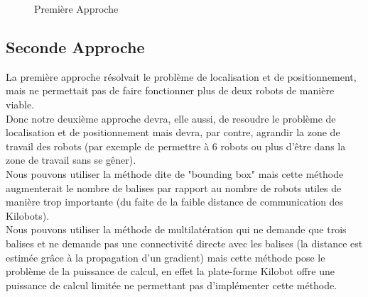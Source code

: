 \documentclass[a4paper,8pt]{report}
\begin{document}
\begin{figure}
  \caption{Premi\`ere Approche}
  \label{figureI}
\end{figure}

\subsection*{Seconde Approche}\label{sec:name}

La premi\`ere approche r\'esolvait le probl\`eme de localisation et de positionnement, mais ne permettait pas de faire fonctionner plus de deux robots de mani\`ere viable.\\
Donc notre deuxi\`eme approche devra, elle aussi, de resoudre le probl\`eme de localisation et de positionnement mais devra, par contre, agrandir la zone de travail des robots (par exemple de permettre \`a 6 robots ou plus d'\^etre dans la zone de travail sans se g\^ener).\\

\medskip
Nous pouvons utiliser la m\'ethode dite de "bounding box" mais cette m\'ethode augmenterait le nombre de balises par rapport au nombre de robots utiles de mani\`ere trop importante (du faite de la faible distance de communication des Kilobots).\\
Nous pouvons utiliser la m\'ethode de multilat\'eration qui ne demande que trois balises et ne demande pas une connectivit\'e directe avec les balises (la distance est estim\'ee gr\^ace \`a la propagation d'un gradient) mais cette m\'ethode pose le probl\`eme de la puissance de calcul, en effet la plate-forme Kilobot offre une puissance de calcul limit\'ee ne permettant pas d'impl\'ementer cette m\'ethode.\\
\end{document}
